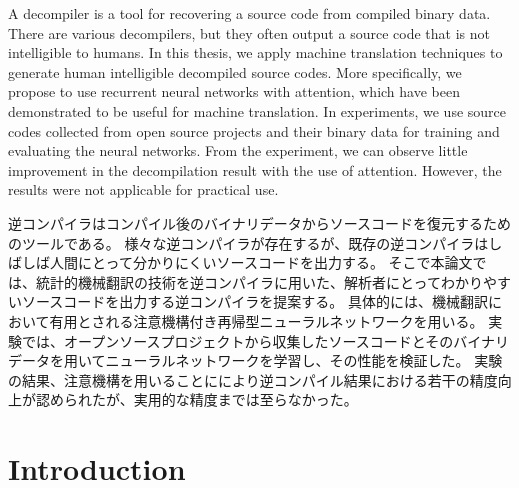 \documentclass[senior,final,11pt]{iscs-thesis}
\date{December 11, 2018}
\begin{document}
\begin{eabstract}
A decompiler is a tool for recovering a source code from compiled binary data.
There are various decompilers, but they often output a source code that is not intelligible to humans. 
In this thesis, we apply machine translation techniques to generate human intelligible decompiled source codes. 
More specifically, we propose to use recurrent neural networks with attention, 
which have been demonstrated to be useful for machine translation. 
In experiments, we use source codes collected from open source projects and their binary data for training and evaluating the neural networks.
From the experiment, we can observe little improvement in the decompilation result with the use of attention.
However, the results were not applicable for practical use.

\end{eabstract}
\begin{jabstract}
逆コンパイラはコンパイル後のバイナリデータからソースコードを復元するためのツールである。
様々な逆コンパイラが存在するが、既存の逆コンパイラはしばしば人間にとって分かりにくいソースコードを出力する。
そこで本論文では、統計的機械翻訳の技術を逆コンパイラに用いた、解析者にとってわかりやすいソースコードを出力する逆コンパイラを提案する。
具体的には、機械翻訳において有用とされる注意機構付き再帰型ニューラルネットワークを用いる。
実験では、オープンソースプロジェクトから収集したソースコードとそのバイナリデータを用いてニューラルネットワークを学習し、その性能を検証した。
実験の結果、注意機構を用いることににより逆コンパイル結果における若干の精度向上が認められたが、実用的な精度までは至らなかった。
\end{jabstract}

\maketitle

\chapter{Introduction}
\end{document}
